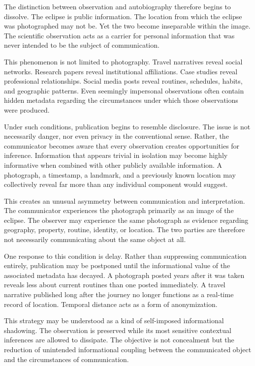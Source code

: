 \documentclass[11pt]{article}
\theoremstyle{plain}
\begin{document}
The distinction between observation and autobiography therefore begins to dissolve. The eclipse is public information. The location from which the eclipse was photographed may not be. Yet the two become inseparable within the image. The scientific observation acts as a carrier for personal information that was never intended to be the subject of communication.

This phenomenon is not limited to photography. Travel narratives reveal social networks. Research papers reveal institutional affiliations. Case studies reveal professional relationships. Social media posts reveal routines, schedules, habits, and geographic patterns. Even seemingly impersonal observations often contain hidden metadata regarding the circumstances under which those observations were produced.

Under such conditions, publication begins to resemble disclosure. The issue is not necessarily danger, nor even privacy in the conventional sense. Rather, the communicator becomes aware that every observation creates opportunities for inference. Information that appears trivial in isolation may become highly informative when combined with other publicly available information. A photograph, a timestamp, a landmark, and a previously known location may collectively reveal far more than any individual component would suggest.

This creates an unusual asymmetry between communication and interpretation. The communicator experiences the photograph primarily as an image of the eclipse. The observer may experience the same photograph as evidence regarding geography, property, routine, identity, or location. The two parties are therefore not necessarily communicating about the same object at all.

One response to this condition is delay. Rather than suppressing communication entirely, publication may be postponed until the informational value of the associated metadata has decayed. A photograph posted years after it was taken reveals less about current routines than one posted immediately. A travel narrative published long after the journey no longer functions as a real-time record of location. Temporal distance acts as a form of anonymization.

This strategy may be understood as a kind of self-imposed informational shadowing. The observation is preserved while its most sensitive contextual inferences are allowed to dissipate. The objective is not concealment but the reduction of unintended informational coupling between the communicated object and the circumstances of communication.
\end{document}
